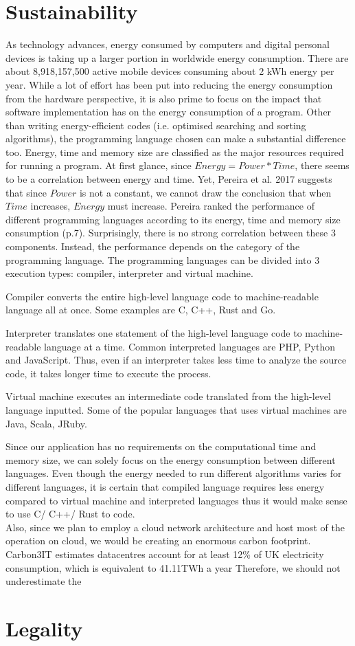 \section{Sustainability}
As technology advances, energy consumed by computers and digital personal devices is taking up a larger portion in worldwide energy consumption. 
There are about 8,918,157,500 active mobile devices consuming about 2 kWh energy per year\cite{energy}.
While a lot of effort has been put into reducing the energy consumption from the hardware perspective,
it is also prime to focus on the impact that software implementation has on the energy consumption of a program.
Other than writing energy-efficient codes (i.e. optimised searching and sorting algorithms), the programming language 
chosen can make a substantial difference too. Energy, time and memory size are classified as the major resources required for running a program.
At first glance, since \(Energy = Power * Time\), there seems to be a correlation between energy and time. Yet,
Pereira et al. 2017\cite{energyplanguage} suggests that since \(Power\) is not a constant, we cannot draw the conclusion that
when \(Time\) increases, \(Energy\) must increase. 
Pereira ranked the performance of different programming languages according to its energy, time and memory size consumption (p.7). 
Surprisingly, there is no strong correlation between these 3 components. 
Instead, the performance depends on the category of the programming language.
The programming languages can be divided into 3 execution types: compiler, interpreter and virtual machine.
\begin{description}
    \item Compiler converts the entire high-level language code to machine-readable language all at once. Some examples are C, C++, Rust and Go. 
    \item Interpreter translates one statement of the high-level language code to machine-readable language at a time. Common interpreted languages are PHP, Python and JavaScript.
    Thus, even if an interpreter takes less time to analyze the source code, it takes longer time to execute the process.
    \item Virtual machine executes an intermediate code translated from the high-level language inputted. Some of the popular languages that uses virtual machines are Java, Scala, JRuby.
\end{description}
Since our application has no requirements on the computational time and memory size, we can solely focus on the energy consumption between 
different languages. Even though the energy needed to run different algorithms varies for different languages, it is certain that
compiled language requires less energy compared to virtual machine and interpreted languages thus it would make sense to use C/ C++/ Rust to code.\\
Also, since we plan to employ a cloud network architecture and host most of the operation on cloud, we would be creating an enormous carbon footprint.
Carbon3IT estimates datacentres account for at least 12\% of UK electricity consumption, which is equivalent to 41.11TWh a year \cite{carbon}
Therefore, we should not underestimate the 

\section{Legality}
